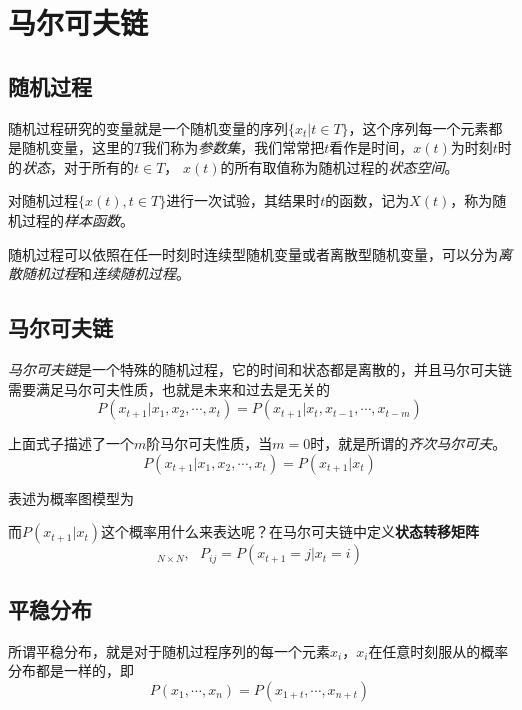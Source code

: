 \chapter{马尔可夫链}

\section{随机过程}

随机过程研究的变量就是一个随机变量的序列$\{x_t|t\in T\}$，这个序列每一个元素都是随机变量，这里的$T$我们称为\textsl{参数集}，我们常常把$t$看作是时间，$x(t)$为时刻$t$时的\textsl{状态}，对于所有的$t\in T$，
$x(t)$的所有取值称为随机过程的\textsl{状态空间}。

对随机过程$\{x(t),t\in T\}$进行一次试验，其结果时$t$的函数，记为$X(t)$，称为随机过程的\textsl{样本函数}。

随机过程可以依照在任一时刻时连续型随机变量或者离散型随机变量，可以分为\textsl{离散随机过程}和\textsl{连续随机过程}。


\section{马尔可夫链}
\textsl{马尔可夫链}是一个特殊的随机过程，它的时间和状态都是离散的，并且马尔可夫链需要满足马尔可夫性质，也就是未来和过去是无关的
\begin{equation}
    P(x_{t+1}|x_1,x_2,\cdots,x_t)=P(x_{t+1}|x_t,x_{t-1},\cdots,x_{t-m})
\end{equation}

上面式子描述了一个$m$阶马尔可夫性质，当$m=0$时，就是所谓的\textsl{齐次马尔可夫}。
\begin{equation}
    P(x_{t+1}|x_1,x_2,\cdots,x_t)=P(x_{t+1}|x_{t})
\end{equation}

表述为概率图模型为

而$P(x_{t+1}|x_t)$这个概率用什么来表达呢？在马尔可夫链中定义\textbf{状态转移矩阵}
\begin{equation}
    [P_{ij}]_{N\times N},\ \ \ P_{ij}=P(x_{t+1}=j|x_t=i)
\end{equation}

\section{平稳分布}

所谓平稳分布，就是对于随机过程序列的每一个元素$x_i$，$x_i$在任意时刻服从的概率分布都是一样的，即
\begin{equation}
    P(x_1,\cdots,x_n)=P(x_{1+t},\cdots,x_{n+t})
\end{equation}


